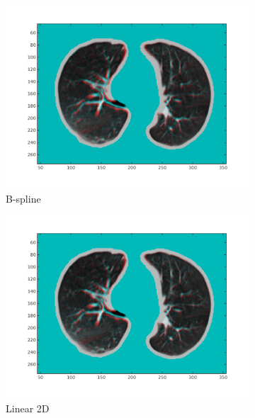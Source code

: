 \documentclass[11pt,a4paper,oneside]{report}
\begin{document}
\begin{figure}[H]
\begin{subfigure}[b]{0.33\textwidth}
    \includegraphics[width=\textwidth, trim=0 50 0 0,clip=true]{figures/task4/visAss_m7.png}
    \caption{B-spline}
  \end{subfigure}%
  \begin{subfigure}[b]{0.33\textwidth}
    \includegraphics[width=\textwidth, trim=0 50 0 0,clip=true]{figures/task4/visAss_m8.png}
    \caption{Linear 2D}
  \end{subfigure}
  \begin{subfigure}[b]{0.33\textwidth}

\end{subfigure}
\end{figure}
\end{document}
